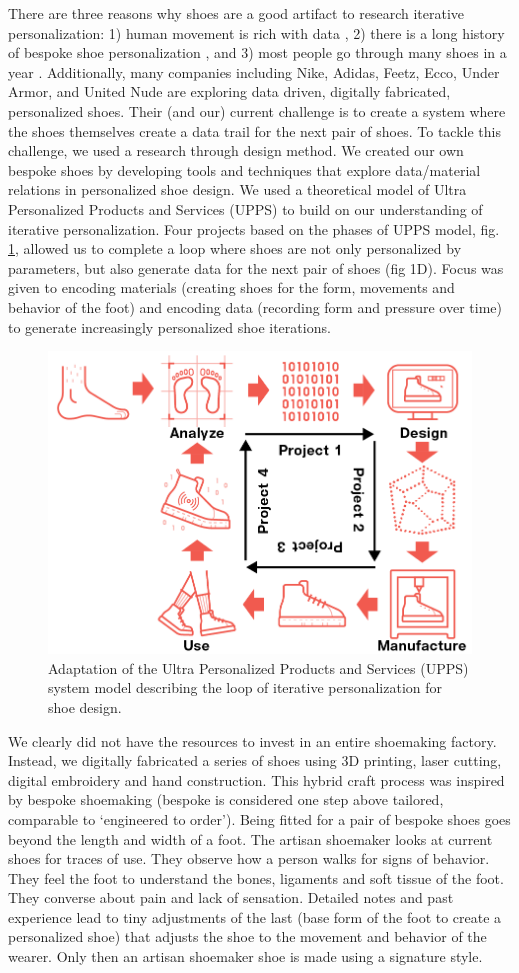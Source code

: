 There are three reasons why shoes are a good artifact to research iterative personalization: 1) human movement is rich with data \cite{Shanthikumar2010}, 2) there is a long history of bespoke shoe personalization \cite{Ball1935}\cite{Greene2018}, and 3) most people go through many shoes in a year \cite{Vertommen2011}. Additionally, many companies including Nike, Adidas, Feetz, Ecco, Under Armor, and United Nude are exploring data driven, digitally fabricated, personalized shoes. Their (and our) current challenge is to create a system where the shoes themselves create a data trail for the next pair of shoes. To tackle this challenge, we used a research through design method. We created our own bespoke shoes by developing tools and techniques that explore data/material relations in personalized shoe design. We used a theoretical model of Ultra Personalized Products and Services (UPPS) \cite{stolwijk2018going} to build on our understanding of iterative personalization. Four projects based on the phases of UPPS model, fig. \ref{fig:UPPSmodel}, allowed us to complete a loop where shoes are not only personalized by parameters, but also generate data for the next pair of shoes (fig 1D). Focus was given to encoding materials (creating shoes for the form, movements and behavior of the foot) and encoding data (recording form and pressure over time) to generate increasingly personalized shoe iterations. 

\begin{figure}
\includegraphics[width=.5\textwidth]{UPPSmodel}
\caption{Adaptation of the Ultra Personalized Products and Services (UPPS) system model describing the loop of iterative personalization for shoe design.}
\label{fig:UPPSmodel}
\end{figure}

We clearly did not have the resources to invest in an entire shoemaking factory. Instead, we digitally fabricated a series of shoes using 3D printing, laser cutting, digital embroidery and hand construction. This hybrid craft \cite{Devendorf2015} process was inspired by bespoke shoemaking (bespoke is considered one step above tailored, comparable to `engineered to order'). Being fitted for a pair of bespoke shoes goes beyond the length and width of a foot. The artisan shoemaker looks at current shoes for traces of use. They observe how a person walks for signs of behavior. They feel the foot to understand the bones, ligaments and soft tissue of the foot. They converse about pain and lack of sensation. Detailed notes and past experience lead to tiny adjustments of the last (base form of the foot to create a personalized shoe) that adjusts the shoe to the movement and behavior of the wearer. Only then an artisan shoemaker shoe is made using a signature style. 

